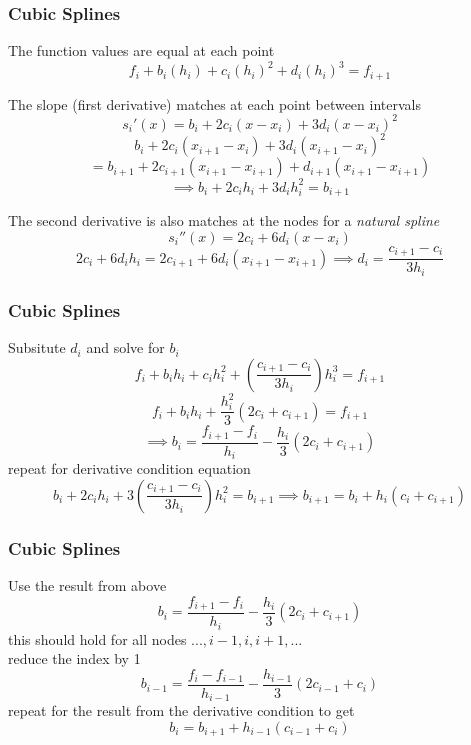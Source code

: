 \documentclass[fleqn]{beamer} %
\newcommand{\sectionIIIsubsectionIVtitle}{Cubic Splines}
\begin{document}
			\begin{frame}
				\frametitle{\sectionIIIsubsectionIVtitle} 
				\bigskip
        
        The function values are equal at each point
        \[f_i+b_i\left(h_i\right)+c_i\left(h_i\right)^2+d_i\left(h_i\right)^3=f_{i+1}\]
      
        The slope (first derivative) matches at each point between intervals 
        \[s_i'\left(x\right)=b_i+2c_i\left(x-x_i\right)+3d_i\left(x-x_i\right)^2\]
        \[b_i+2c_i\left(x_{i+1}-x_i\right)+3d_i\left(x_{i+1}-x_i\right)^2\]
        \[= b_{i+1}+2c_{i+1}\left(x_{i+1}-x_{i+1}\right)+d_{i+1}\left(x_{i+1}-x_{i+1}\right)\] 
        \[\implies b_i+2c_ih_i+3d_ih_i^2=b_{i+1}\]
  
        The second derivative is also matches at the nodes for a {\it natural spline} 
        \[s_i''\left(x\right)=2c_i+6d_i\left(x-x_i\right)\]
        \[2c_i + 6d_ih_i=2c_{i+1} + 6d_i\left(x_{i+1}-x_{i+1}\right) \implies d_i=\frac{c_{i+1}-c_i}{3h_i}\]

        \btVFill
			\end{frame}	
	
			\begin{frame}
				\frametitle{\sectionIIIsubsectionIVtitle} 
				\bigskip
        Subsitute $d_i$ and solve for $b_i$ 
        \[f_i+b_ih_i+c_ih_i^2+\left(\frac{c_{i+1}-c_i}{3h_i}\right)h_i^3=f_{i+1}\]
        \[f_i+b_ih_i+\frac{h_i^2}{3}\left(2c_i+c_{i+1}\right)=f_{i+1}\]
        \[\implies b_i=\frac{f_{i+1}-f_i}{h_i}-\frac{h_i}{3}\left(2c_i+c_{i+1}\right)\]
        repeat for derivative condition equation
        \[b_i+2c_ih_i+3\left(\frac{c_{i+1}-c_i}{3h_i}\right)h_i^2=b_{i+1}\implies b_{i+1}=b_i+h_i\left(c_i+c_{i+1}\right)\]

				\btVFill
			\end{frame}	

			\begin{frame}
				\frametitle{\sectionIIIsubsectionIVtitle} 
				\bigskip
        Use the result from above
        \[b_i=\frac{f_{i+1}-f_i}{h_i}-\frac{h_i}{3}\left(2c_i+c_{i+1}\right)\]
        this should hold for all nodes $...,i-1, i, i+1,...$ \\
        reduce the index by 1
        \[b_{i-1}=\frac{f_i-f_{i-1}}{h_{i-1}}-\frac{h_{i-1}}{3}\left(2c_{i-1}+c_i\right)\]
        repeat for the result from the derivative condition to get
        \[b_i=b_{i+1}+h_{i-1}\left(c_{i-1}+c_i\right)\] 
				\btVFill
			\end{frame}	
	
\end{document}
